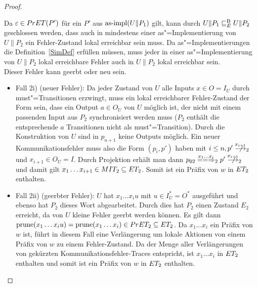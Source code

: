 \begin{proof}
\begin{itemize}
      Da $\varepsilon\in PrET (P')$ für ein $P'$ aus $\mathrm{as}\text{-}\mathrm{impl} (U\|P_1)$ gilt,
      kann durch $U\|P_1 \sqsubseteq  _E^\mathrm{B} U\|P_2$ geschlossen werden, dass auch in
      mindestens einer as"=Implementierung von $U\|P_2$ ein Fehler-Zustand
      lokal erreichbar sein muss. Da as"=Implementierungen die
      Definition~\ref{SimDef} erfüllen müssen, muss jeder in einer
      as"=Implementierung von $U\|P_2$ lokal erreichbare Fehler auch in
      $U\|P_2$ lokal erreichbar sein.\\
      Dieser Fehler kann geerbt oder neu sein.
      \begin{itemize}
        \item Fall 2i) (neuer Fehler): Da jeder Zustand von $U$ alle Inputs
          $x\in O=I_U$ durch must"=Transitionen erzwingt, muss ein lokal
          erreichbarer Fehler-Zustand der Form sein, dass ein Output $a\in O_U$
          von $U$ möglich ist, der nicht mit einem passenden Input aus $P_2$
          synchronisiert werden muss ($P_2$ enthält die entsprechende $a$
          Transitionen nicht als must"=Transition). Durch die Konstruktion von
          $U$ sind in $p_{n+1}$ keine Outputs möglich. Ein neuer
          Kommunikationsfehler muss also die Form $(p_i,p')$ haben mit $i\leq
          n, p'\nmust[x_{i+1}]_2$ und $x_{i+1}\in O_U=I$. Durch Projektion
          erhält man dann $p_{02}\lweakmay[x_1\dots x_i]_2p'\nmust[x_{i+1}]_2$
          und damit gilt $x_1\dots x_{i+1}\in MIT _2\subseteq ET _2$. Somit
          ist ein Präfix von $w$ in $ET _2$ enthalten.
        \item Fall 2ii) (geerbter Fehler): $U$ hat $x_1\dots x_iu$ mit $u\in
          I_U^*=O^*$ ausgeführt und ebenso hat $P_2$ dieses Wort abgearbeitet.
          Durch dies hat $P_2$ einen Zustand $E_2$ erreicht, da von $U$ kleine
          Fehler geerbt werden können. Es gilt dann $\mathrm{prune} (x_1\dots x_iu) =
          \mathrm{prune} (x_1\dots x_i)\in PrET _2\subseteq ET _2$. Da $x_1\dots x_i$
          ein Präfix von $w$ ist, führt in diesem Fall eine Verlängerung um
          lokale Aktionen von einem Präfix von $w$ zu einem Fehler-Zustand. Da
          \ET{} der Menge aller Verlängerungen von gekürzten
          Kommunikationsfehler-Traces entspricht, ist $x_1\dots x_i$ in $ET
          _2$ enthalten und somit ist ein Präfix von $w$ in $ET _2$ enthalten.
      \end{itemize}
  \end{itemize}


\end{proof}
